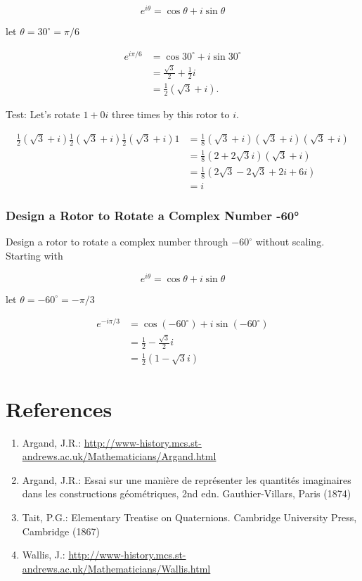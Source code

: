 \documentclass[10pt]{article}
\begin{document}
$$
e^{i \theta}=\cos \theta+i \sin \theta
$$

let $\theta=30^{\circ}=\pi / 6$

$$
\begin{aligned}
e^{i \pi / 6} & =\cos 30^{\circ}+i \sin 30^{\circ} \\
& =\frac{\sqrt{3}}{2}+\frac{1}{2} i \\
& =\frac{1}{2}(\sqrt{3}+i) .
\end{aligned}
$$

Test: Let's rotate $1+0 i$ three times by this rotor to $i$.

$$
\begin{aligned}
\frac{1}{2}(\sqrt{3}+i) \frac{1}{2}(\sqrt{3}+i) \frac{1}{2}(\sqrt{3}+i) 1 & =\frac{1}{8}(\sqrt{3}+i)(\sqrt{3}+i)(\sqrt{3}+i) \\
& =\frac{1}{8}(2+2 \sqrt{3} i)(\sqrt{3}+i) \\
& =\frac{1}{8}(2 \sqrt{3}-2 \sqrt{3}+2 i+6 i) \\
& =i
\end{aligned}
$$

\subsubsection{Design a Rotor to Rotate a Complex Number -60°}
Design a rotor to rotate a complex number through $-60^{\circ}$ without scaling. Starting with

$$
e^{i \theta}=\cos \theta+i \sin \theta
$$

let $\theta=-60^{\circ}=-\pi / 3$

$$
\begin{aligned}
e^{-i \pi / 3} & =\cos \left(-60^{\circ}\right)+i \sin \left(-60^{\circ}\right) \\
& =\frac{1}{2}-\frac{\sqrt{3}}{2} i \\
& =\frac{1}{2}(1-\sqrt{3} i)
\end{aligned}
$$

\section{References}
\begin{enumerate}
  \item Argand, J.R.: \href{http://www-history.mcs.st-andrews.ac.uk/Mathematicians/Argand.html}{http://www-history.mcs.st-andrews.ac.uk/Mathematicians/Argand.html}

  \item Argand, J.R.: Essai sur une manière de représenter les quantités imaginaires dans les constructions géométriques, 2nd edn. Gauthier-Villars, Paris (1874)

  \item Tait, P.G.: Elementary Treatise on Quaternions. Cambridge University Press, Cambridge (1867)

  \item Wallis, J.: \href{http://www-history.mcs.st-andrews.ac.uk/Mathematicians/Wallis.html}{http://www-history.mcs.st-andrews.ac.uk/Mathematicians/Wallis.html}

\end{enumerate}
\end{document}
